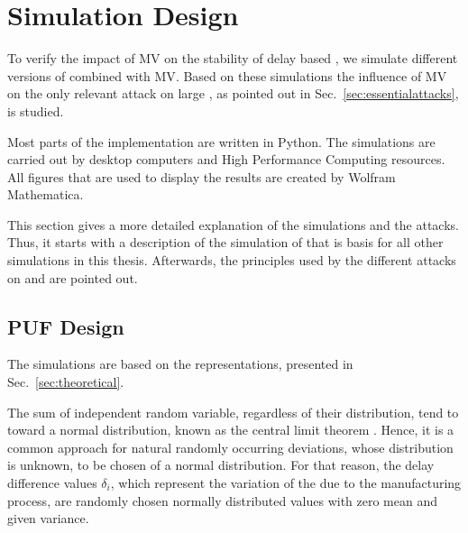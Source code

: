 \chapter{Simulation Design}
\label{cap:simulationdesign}

To verify the impact of \ac{MV} on the stability of delay based \pufs, we simulate different versions of \apufs combined with \ac{MV}.
Based on these simulations the influence of \ac{MV} on the only relevant attack on large \xpufs, as pointed out in Sec.\ \ref{sec:essentialattacks}, is studied.

Most parts of the implementation are written in Python. 
The simulations are carried out by desktop computers and High Performance Computing resources. 
All figures that are used to display the results are created by Wolfram Mathematica.

This section gives a more detailed explanation of the simulations and the attacks.
Thus, it starts with a description of the simulation of \apufs that is basis for all other \puf simulations in this thesis.
Afterwards, the principles used by the different attacks on \mpufs and \mxpufs are pointed out.



\section{\ac{PUF} Design}
\label{sec:pufsimulation}

The \apuf simulations are based on the \apuf representations, presented in Sec.\ \ref{sec:theoretical}.

The sum of independent random variable, regardless of their distribution, tend to toward a normal distribution, known as the central limit theorem \cite{Polya1920UberMomentenproblem}.
Hence, it is a common approach for natural randomly occurring deviations, whose distribution is unknown, to be chosen of a normal distribution.
For that reason, the delay difference values $\delta_i$, which represent the variation of the \apuf due to the manufacturing process, are randomly chosen normally distributed values with zero mean and given variance. %

